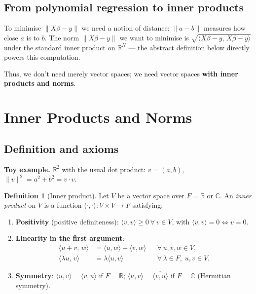 \documentclass[11pt]{article}
\theoremstyle{definition}
\newtheorem{definition}{Definition}[section]
\theoremstyle{plain}
\begin{document}
\subsection{From polynomial regression to inner products}

To minimise $\|X\beta - y\|$ we need a notion of distance: $\|a - b\|$
measures how close $a$ is to $b$.  The norm $\|X\beta - y\|$ we want to
minimise is $\sqrt{\langle X\beta - y,\, X\beta - y\rangle}$ under the
standard inner product on $\mathbb{R}^N$ --- the abstract definition below
directly powers this computation.

Thus, we don't need merely vector spaces; we need vector spaces
\textbf{with inner products and norms}.

\section{Inner Products and Norms}

\subsection{Definition and axioms}

\textbf{Toy example.}  $\mathbb{R}^2$ with the usual dot product:
$v = (a, b)$, $\|v\|^2 = a^2 + b^2 = v \cdot v$.

\begin{definition}[Inner product]
  Let $V$ be a vector space over $F = \mathbb{R}$ or $\mathbb{C}$.
  An \emph{inner product} on $V$ is a function
  $\langle\cdot,\cdot\rangle : V \times V \to F$ satisfying:
  \begin{enumerate}
    \item \textbf{Positivity} (positive definiteness):
      $\langle v, v\rangle \geq 0\ \forall\,v \in V$,
      with $\langle v, v\rangle = 0 \Leftrightarrow v = 0$.
    \item \textbf{Linearity in the first argument}:
      \begin{align*}
        \langle u + v,\, w\rangle &= \langle u, w\rangle + \langle v, w\rangle
          &&\forall\, u,v,w \in V,\\
        \langle \lambda u,\, v\rangle &= \lambda\langle u, v\rangle
          &&\forall\, \lambda \in F,\; u,v \in V.
      \end{align*}
    \item \textbf{Symmetry}:
      $\langle u, v\rangle = \langle v, u\rangle$ if $F = \mathbb{R}$;
      \quad
      $\langle u, v\rangle = \overline{\langle v, u\rangle}$
      if $F = \mathbb{C}$ (Hermitian symmetry).
  \end{enumerate}
\end{definition}
\end{document}
